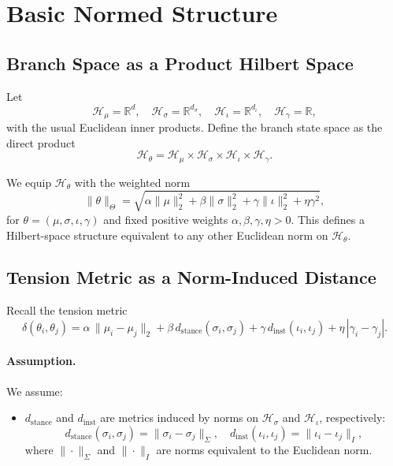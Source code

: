\documentclass[11pt, a4paper]{article}
\begin{document}
\section{Basic Normed Structure}

\subsection{Branch Space as a Product Hilbert Space}

Let
\[
\mathcal{H}_\mu = \mathbb{R}^d,
\quad
\mathcal{H}_\sigma = \mathbb{R}^{d_\sigma},
\quad
\mathcal{H}_\iota = \mathbb{R}^{d_\iota},
\quad
\mathcal{H}_\gamma = \mathbb{R},
\]
with the usual Euclidean inner products.
Define the branch state space as the direct product
\[
\mathcal{H}_\theta
  = \mathcal{H}_\mu \times \mathcal{H}_\sigma \times
    \mathcal{H}_\iota \times \mathcal{H}_\gamma.
\]

We equip $\mathcal{H}_\theta$ with the weighted norm
\[
\|\theta\|_{\Theta}
=
\sqrt{
  \alpha \|\mu\|_2^2
  + \beta \|\sigma\|_2^2
  + \gamma \|\iota\|_2^2
  + \eta \gamma^2
},
\]
for $\theta = (\mu,\sigma,\iota,\gamma)$ and fixed positive weights $\alpha,\beta,\gamma,\eta > 0$.
This defines a Hilbert-space structure equivalent to any other Euclidean norm on $\mathcal{H}_\theta$.

\subsection{Tension Metric as a Norm-Induced Distance}

Recall the tension metric
\[
\delta(\theta_i,\theta_j)
=
\alpha \,\lVert \mu_i-\mu_j \rVert_2
+
\beta \, d_{\mathrm{stance}}(\sigma_i,\sigma_j)
+
\gamma \, d_{\mathrm{inst}}(\iota_i,\iota_j)
+
\eta \, |\gamma_i-\gamma_j|.
\]

\paragraph{Assumption.}
We assume:
\begin{itemize}[nosep]
  \item $d_{\mathrm{stance}}$ and $d_{\mathrm{inst}}$ are metrics induced by norms on $\mathcal{H}_\sigma$ and $\mathcal{H}_\iota$, respectively:
  \[
  d_{\mathrm{stance}}(\sigma_i,\sigma_j) = \|\sigma_i-\sigma_j\|_{\Sigma},\quad
  d_{\mathrm{inst}}(\iota_i,\iota_j) = \|\iota_i-\iota_j\|_{I},
  \]
  where $\|\cdot\|_{\Sigma}$ and $\|\cdot\|_{I}$ are norms equivalent to the Euclidean norm.
\end{itemize}
\end{document}
